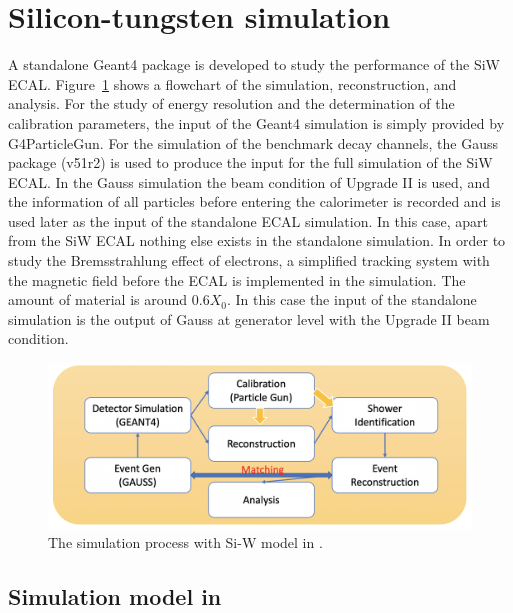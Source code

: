 \section{Silicon-tungsten \ecal simulation}

A standalone Geant4 package is developed to study the performance of the SiW ECAL.
Figure~\ref{fig:process} shows a flowchart of the simulation, 
reconstruction, and analysis. For the study of energy resolution and the determination of the calibration parameters, 
the input of the Geant4 simulation is simply provided by G4ParticleGun. 
For the simulation of the benchmark decay channels, 
the Gauss package (v51r2) is used to produce the input for the full simulation of the SiW ECAL. 
In the Gauss simulation the beam condition of Upgrade II is used, 
and the information of all particles before entering the calorimeter is recorded and is used later as the input of the standalone ECAL simulation. 
In this case, apart from the SiW ECAL nothing else exists in the standalone simulation.
In order to study the Bremsstrahlung effect of electrons, 
a simplified tracking system with the magnetic field before the ECAL is implemented in the simulation. 
The amount of material is around $0.6X_0$. 
In this case the input of the standalone simulation is the output of Gauss at generator level with the Upgrade II beam condition.

\begin{figure}[hb]
  \begin{center}
    \includegraphics[width=0.95\linewidth]{Figures/06_ECAL/procedure.png}%
    \vspace*{-0.5cm}
  \end{center}
  \caption{
   The simulation process with Si-W \ecal model in \geant.
  }
  \label{fig:process}
\end{figure}

\subsection{Simulation model in \geant}
\label{subsec:Detector}

